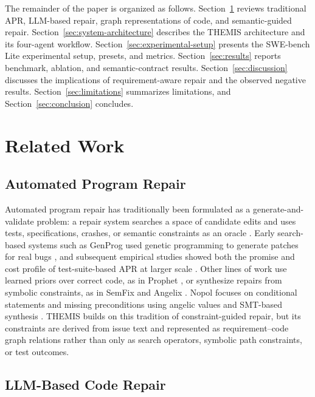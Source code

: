\documentclass[11pt]{article}
\begin{document}
The remainder of the paper is organized as follows.  Section~\ref{sec:related-work} reviews traditional APR, LLM-based repair, graph representations of code, and semantic-guided repair.  Section~\ref{sec:system-architecture} describes the THEMIS architecture and its four-agent workflow.  Section~\ref{sec:experimental-setup} presents the SWE-bench Lite experimental setup, presets, and metrics.  Section~\ref{sec:results} reports benchmark, ablation, and semantic-contract results.  Section~\ref{sec:discussion} discusses the implications of requirement-aware repair and the observed negative results.  Section~\ref{sec:limitations} summarizes limitations, and Section~\ref{sec:conclusion} concludes.

\section{Related Work}
\label{sec:related-work}

\subsection{Automated Program Repair}
\label{subsec:apr}

Automated program repair has traditionally been formulated as a generate-and-validate problem: a repair system searches a space of candidate edits and uses tests, specifications, crashes, or semantic constraints as an oracle \citep{monperrus-2018-automatic-repair-bibliography}.  Early search-based systems such as GenProg used genetic programming to generate patches for real bugs \citep{weimer-etal-2009-genprog}, and subsequent empirical studies showed both the promise and cost profile of test-suite-based APR at larger scale \citep{legoues-etal-2012-systematic-apr}.  Other lines of work use learned priors over correct code, as in Prophet \citep{long-rinard-2016-prophet}, or synthesize repairs from symbolic constraints, as in SemFix and Angelix \citep{nguyen-etal-2013-semfix,mechtaev-etal-2016-angelix}.  Nopol focuses on conditional statements and missing preconditions using angelic values and SMT-based synthesis \citep{xuan-etal-2017-nopol}.  THEMIS builds on this tradition of constraint-guided repair, but its constraints are derived from issue text and represented as requirement--code graph relations rather than only as search operators, symbolic path constraints, or test outcomes.

\subsection{LLM-Based Code Repair}
\label{subsec:llm-repair}
\end{document}
